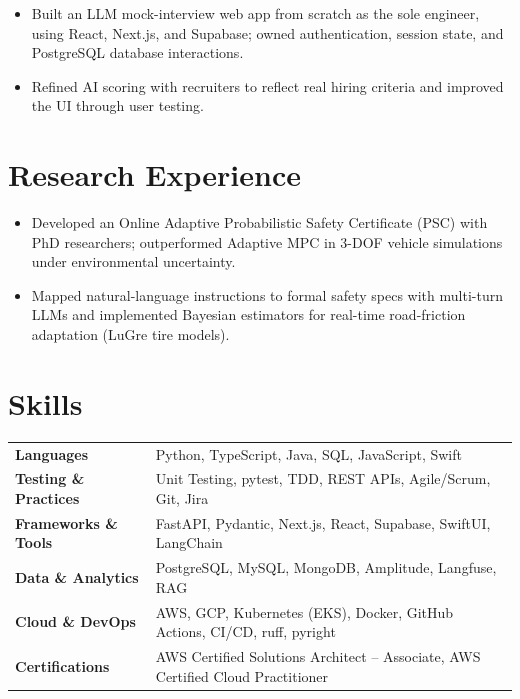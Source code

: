 \documentclass[11pt, letterpaper]{article}
\begin{document}
\begin{itemize}
  \item Built an LLM mock-interview web app from scratch as the sole engineer, using React, Next.js, and Supabase; owned authentication, session state, and PostgreSQL database interactions.
  \item Refined AI scoring with recruiters to reflect real hiring criteria and improved the UI through user testing.
\end{itemize}

\section{Research Experience}
\begin{itemize}
  \item Developed an Online Adaptive Probabilistic Safety Certificate (PSC) with PhD researchers; outperformed Adaptive MPC in 3-DOF vehicle simulations under environmental uncertainty.
  \item Mapped natural-language instructions to formal safety specs with multi-turn LLMs and implemented Bayesian estimators for real-time road-friction adaptation (LuGre tire models).
\end{itemize}

\section{Skills}
\begin{tabularx}{\textwidth}{@{}l @{\hspace{7pt}} >{\raggedright\arraybackslash}X@{}}
  \textbf{Languages} & Python, TypeScript, Java, SQL, JavaScript, Swift \\[1pt]
  \textbf{Testing \& Practices} & Unit Testing, pytest, TDD, REST APIs, Agile/Scrum, Git, Jira \\[1pt]
  \textbf{Frameworks \& Tools} & FastAPI, Pydantic, Next.js, React, Supabase, SwiftUI, LangChain \\[1pt]
  \textbf{Data \& Analytics} & PostgreSQL, MySQL, MongoDB, Amplitude, Langfuse, RAG \\[1pt]
  \textbf{Cloud \& DevOps} & AWS, GCP, Kubernetes (EKS), Docker, GitHub Actions, CI/CD, ruff, pyright \\[1pt]
  \textbf{Certifications} & AWS Certified Solutions Architect -- Associate, AWS Certified Cloud Practitioner \\
\end{tabularx}
\end{document}
